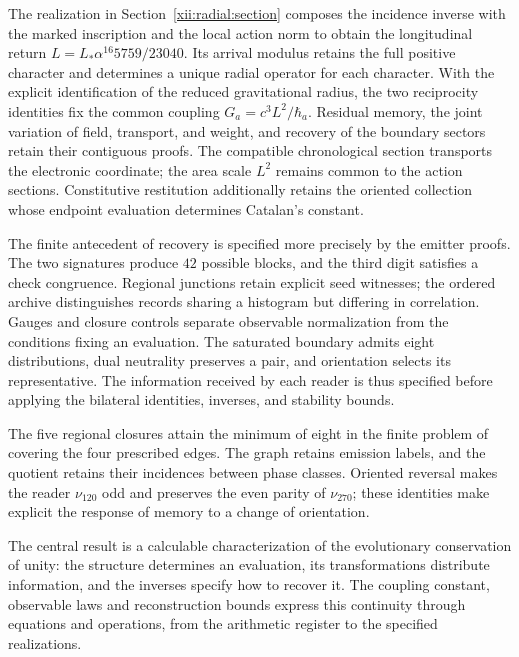 The realization in Section~\ref{xii:radial:section} composes the incidence
inverse with the marked inscription and the local action norm to obtain
the longitudinal return \(L=L_*\alpha^{16}5759/23040\).
Its arrival modulus retains the full positive character and determines
a unique radial operator for each character. With the explicit identification
of the reduced gravitational radius, the two reciprocity identities fix
the common coupling \(G_a=c^3L^2/\hbar_a\). Residual memory, the joint
variation of field, transport, and weight, and recovery of the boundary
sectors retain their contiguous proofs. The compatible chronological section
transports the electronic coordinate; the area scale \(L^2\) remains common
to the action sections. Constitutive restitution additionally retains
the oriented collection whose endpoint evaluation determines Catalan's constant.

The finite antecedent of recovery is specified more precisely by the
emitter proofs. The two signatures produce \(42\) possible blocks, and
the third digit satisfies a check congruence. Regional junctions retain
explicit seed witnesses; the ordered archive distinguishes records
sharing a histogram but differing in correlation. Gauges and closure
controls separate observable normalization from the conditions fixing
an evaluation. The saturated boundary admits eight distributions,
dual neutrality preserves a pair, and orientation selects its
representative. The information received by each reader is thus
specified before applying the bilateral identities, inverses, and
stability bounds.

The five regional closures attain the minimum of eight in the finite
problem of covering the four prescribed edges. The graph retains
emission labels, and the quotient retains their incidences between
phase classes. Oriented reversal makes the reader \(\nu_{120}\) odd
and preserves the even parity of \(\nu_{270}\); these identities
make explicit the response of memory to a change of orientation.



The central result is a calculable characterization of the evolutionary conservation of unity: the structure determines an evaluation, its transformations distribute information, and the inverses specify how to recover it. The coupling constant, observable laws and reconstruction bounds express this continuity through equations and operations, from the arithmetic register to the specified realizations.
